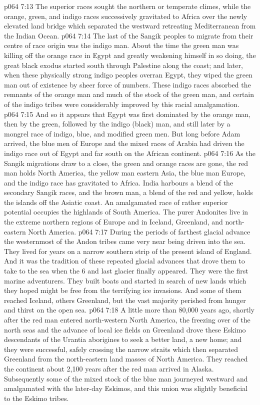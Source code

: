\vs p064 7:13 \pc The superior races sought the northern or temperate climes, while the orange, green, and indigo races successively gravitated to Africa over the newly elevated land bridge which separated the westward retreating Mediterranean from the Indian Ocean.
\vs p064 7:14 The last of the Sangik peoples to migrate from their centre of race origin was the indigo man. About the time the green man was killing off the orange race in Egypt and greatly weakening himself in so doing, the great black exodus started south through Palestine along the coast; and later, when these physically strong indigo peoples overran Egypt, they wiped the green man out of existence by sheer force of numbers. These indigo races absorbed the remnants of the orange man and much of the stock of the green man, and certain of the indigo tribes were considerably improved by this racial amalgamation.
\vs p064 7:15 And so it appears that Egypt was first dominated by the orange man, then by the green, followed by the indigo (black) man, and still later by a mongrel race of indigo, blue, and modified green men. But long before Adam arrived, the blue men of Europe and the mixed races of Arabia had driven the indigo race out of Egypt and far south on the African continent.
\vs p064 7:16 As the Sangik migrations draw to a close, the green and orange races are gone, the red man holds North America, the yellow man eastern Asia, the blue man Europe, and the indigo race has gravitated to Africa. India harbours a blend of the secondary Sangik races, and the brown man, a blend of the red and yellow, holds the islands off the Asiatic coast. An amalgamated race of rather superior potential occupies the highlands of South America. The purer Andonites live in the extreme northern regions of Europe and in Iceland, Greenland, and north\hyp{}eastern North America.
\vs p064 7:17 \pc During the periods of farthest glacial advance the westernmost of the Andon tribes came very near being driven into the sea. They lived for years on a narrow southern strip of the present island of England. And it was the tradition of these repeated glacial advances that drove them to take to the sea when the 6 and last glacier finally appeared. They were the first marine adventurers. They built boats and started in search of new lands which they hoped might be free from the terrifying ice invasions. And some of them reached Iceland, others Greenland, but the vast majority perished from hunger and thirst on the open sea.
\vs p064 7:18 A little more than 80,000 years ago, shortly after the red man entered north\hyp{}western North America, the freezing over of the north seas and the advance of local ice fields on Greenland drove these Eskimo descendants of the Urantia aborigines to seek a better land, a new home; and they were successful, safely crossing the narrow straits which then separated Greenland from the north\hyp{}eastern land masses of North America. They reached the continent about 2,100 years after the red man arrived in Alaska. Subsequently some of the mixed stock of the blue man journeyed westward and amalgamated with the later\hyp{}day Eskimos, and this union was slightly beneficial to the Eskimo tribes.
